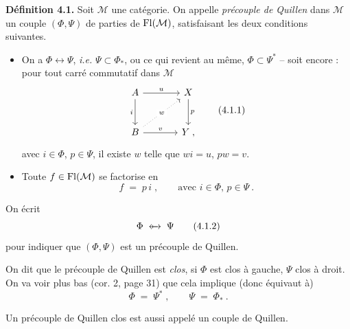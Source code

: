 \textbf{Définition 4.1.} Soit $\mathcal{M}$ une catégorie. On appelle \textit{précouple de Quillen} dans $\mathcal{M}$ un couple $(\Phi,\Psi)$ de parties de $\mathrm{Fl}(\mathcal{M})$, satisfaisant les deux conditions suivantes.
\begin{itemize}[leftmargin=2.5em]
\item[\textit{a})] On a $\Phi\longleftrightarrow\Psi$, \textit{i.e.} $\Psi\subset\Phi_*$, ou ce qui revient au même, $\Phi\subset\Psi^*$ -- soit encore : pour tout carré commutatif dans $\mathcal{M}$
\[
\begin{tikzcd}[row sep=large, column sep=large]
A \arrow[r, "u"] \arrow[d, "i"'] & X \arrow[d, "p"] \\
B \arrow[ur, dotted, "w" description] \arrow[r, "v"] & Y \;,
\end{tikzcd}
\tag*{(4.1.1)}
\]
avec $i\in\Phi$, $p\in\Psi$, il existe $w$ telle que $wi=u$, $pw=v$.
\item[\textit{b})] Toute $f\in\mathrm{Fl}(\mathcal{M})$ se factorise en
\[
f \;=\; p\,i\;, \qquad \text{avec } i\in\Phi,\, p\in\Psi\ .
\]
\end{itemize}
On écrit
\[
\Phi \;\mathrel{\leftarrow\!\!\!\!\mapsto}\; \Psi
\tag*{(4.1.2)}
\] %
pour indiquer que $(\Phi,\Psi)$ est un précouple de Quillen.

On dit que le précouple de Quillen est \textit{clos}, si $\Phi$ est clos à gauche, $\Psi$ clos à droit. On va voir plus bas (cor. 2, page 31) que cela implique (donc équivaut à) %
\[
\Phi \;=\; \Psi^*\;, \qquad \Psi \;=\; \Phi_*\ .
\tag*{(4.1.3)}
\]

Un précouple de Quillen clos est aussi appelé un couple de Quillen.

